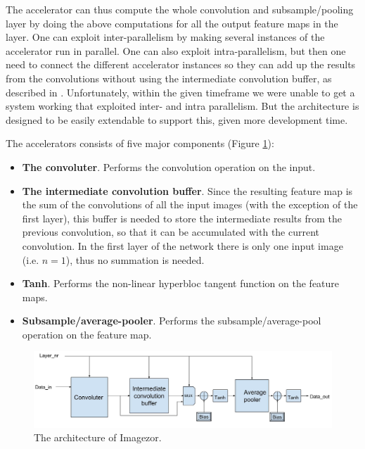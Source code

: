 The accelerator can thus compute the whole convolution and subsample/pooling layer by doing the above computations for all the output feature maps in the layer. One can exploit inter-parallelism by making several instances of the accelerator run in parallel. One can also exploit intra-parallelism, but then one need to connect the different accelerator instances so they can add up the results from the convolutions without using the intermediate convolution buffer, as described in \cite{Chakradhar2010}. Unfortunately, within the given timeframe we were unable to get a system working that exploited inter- and intra parallelism. But the architecture is designed to be easily extendable to support this, given more development time. 


The accelerators consists of five major components (Figure \ref{fig_imagezor_architecture}):

\begin{itemize}
	\item \textbf{The convoluter}. Performs the convolution operation on the input.
	\item \textbf{The intermediate convolution buffer}. Since the resulting feature map is the sum of the convolutions of all the input images (with the exception of the first layer), this buffer is needed to store the intermediate results from the previous convolution, so that it can be accumulated with the current convolution. In the first layer of the network there is only one input image (i.e. $ n = 1 $), thus no summation is needed.
	\item \textbf{Tanh}. Performs the non-linear hyperbloc tangent function  on the feature maps.
	\item \textbf{Subsample/average-pooler}. Performs the subsample/average-pool operation on the feature map. 
\end{itemize}

\begin{figure}[h!]
	\centering
    	\includegraphics[width=1.0\textwidth]{Figures/Method/conv_layer_arch}
  	\caption{The architecture of Imagezor.}
  	\label{fig_imagezor_architecture}
\end{figure}

